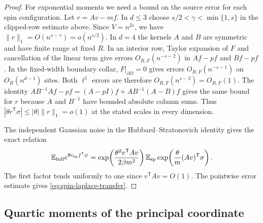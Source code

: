 \documentclass[11pt]{article}
\numberwithin{equation}{section}
\newcommand{\E}{\mathbb E}
\begin{document}
\begin{proof}
For exponential moments we need a bound on the source error for
each spin configuration. Let $r=Av-mf$. In $d\le3$ choose
$s/2<\gamma<\min\{1,s\}$ in the clipped-row estimate above. Since
$V=n^{2s}$, we have $\|r\|_1=O(n^{s-\gamma})=o(n^{s/2})$.
In $d=4$ the kernels $A$ and $B$ are symmetric and have finite
range at fixed $R$. In an interior row, Taylor expansion of $F$ and
cancellation of the linear term give errors $O_{R,F}(n^{-s-2})$
in $Af-pf$ and $Bf-pf$. In the fixed-width boundary collar,
$F|_{\partial\Omega}=0$ gives errors $O_{R,F}(n^{-s-1})$ on
$O_R(n^{d-1})$ sites. Both $\ell^1$ errors are therefore
$O_{R,F}(n^{s-2})=O_{R,F}(1)$. The identity
$AB^{-1}Af-pf=(A-pI)f+AB^{-1}(A-B)f$ gives the same bound for
$r$ because $A$ and $B^{-1}$ have bounded absolute column sums.
Thus $|\theta r^{\mathsf T}\sigma|\le|\theta|\|r\|_1=o(1)$ at
the stated scales in every dimension.

The independent Gaussian noise in the Hubbard--Stratonovich identity
gives the exact relation
\begin{equation}
 \E_{\rm full} e^{\theta c_{\rm sp} f^{\mathsf T}\psi}
 =\exp\!\left(\frac{\theta^2 v^{\mathsf T}Av}{2\beta m^2}\right)
   \E_{\rm sp}\exp\!\left(\frac{\theta}{m}(Av)^{\mathsf T}\sigma\right).
\end{equation}
The first factor tends uniformly to one since $v^{\mathsf T}Av=O(1)$.
The pointwise error estimate gives \eqref{eq:spin-laplace-transfer}.
\end{proof}

\subsection{Quartic moments of the principal coordinate}\label{sec:terminal}
\end{document}
